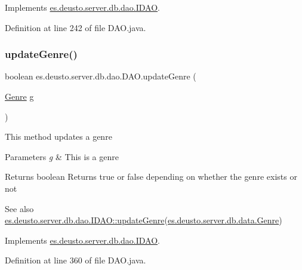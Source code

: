 Implements \hyperlink{interfacees_1_1deusto_1_1server_1_1db_1_1dao_1_1_i_d_a_o_a3a3ca0456879e35349a937aac661ff3f}{es.\+deusto.\+server.\+db.\+dao.\+I\+D\+AO}.



Definition at line 242 of file D\+A\+O.\+java.

\mbox{\label{classes_1_1deusto_1_1server_1_1db_1_1dao_1_1_d_a_o_ae08384fb32fa6936c93f6292dbe02c7e}} 
\subsubsection{\texorpdfstring{update\+Genre()}{updateGenre()}}
{\footnotesize\ttfamily boolean es.\+deusto.\+server.\+db.\+dao.\+D\+A\+O.\+update\+Genre (\begin{DoxyParamCaption}\item[{\hyperlink{classes_1_1deusto_1_1server_1_1db_1_1data_1_1_genre}{Genre}}]{g }\end{DoxyParamCaption})}

This method updates a genre 
\begin{DoxyParams}{Parameters}
{\em g} & This is a genre \\
\hline
\end{DoxyParams}
\begin{DoxyReturn}{Returns}
boolean Returns true or false depending on whether the genre exists or not 
\end{DoxyReturn}
\begin{DoxySeeAlso}{See also}
\hyperlink{interfacees_1_1deusto_1_1server_1_1db_1_1dao_1_1_i_d_a_o_ae989ff2681d6afe8651a595340265c39}{es.\+deusto.\+server.\+db.\+dao.\+I\+D\+A\+O\+::update\+Genre}(\hyperlink{classes_1_1deusto_1_1server_1_1db_1_1data_1_1_genre}{es.\+deusto.\+server.\+db.\+data.\+Genre}) 
\end{DoxySeeAlso}


Implements \hyperlink{interfacees_1_1deusto_1_1server_1_1db_1_1dao_1_1_i_d_a_o_ae989ff2681d6afe8651a595340265c39}{es.\+deusto.\+server.\+db.\+dao.\+I\+D\+AO}.



Definition at line 360 of file D\+A\+O.\+java.

